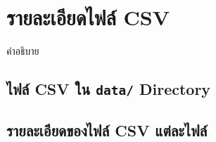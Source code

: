\section{รายละเอียดไฟล์ CSV}

คำอธิบาย

\subsection{ไฟล์ CSV ใน \texttt{data\slash} Directory}
\noindent\blindtext[3]

\subsection{รายละเอียดของไฟล์ CSV แต่ละไฟล์}
\noindent\blindtext[3]
